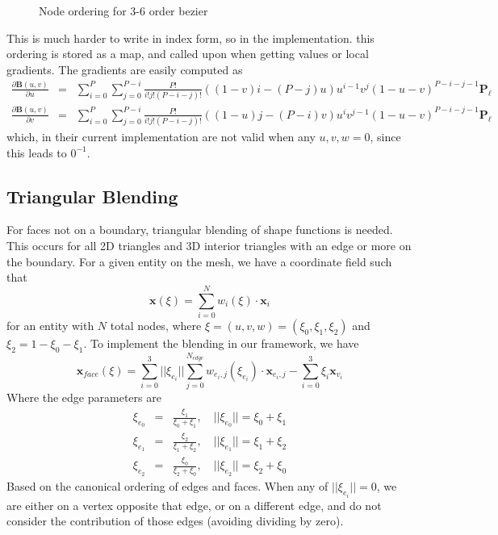 \documentclass{article}
\begin{document}
\begin{figure}
\begin{tikzpicture}[scale=1]
\end{tikzpicture}
\caption{Node ordering for 3-6 order bezier}
\end{figure}


This is much harder to write in index form, so in the implementation. this ordering is stored as a map, and called upon when getting values or local gradients. The gradients are easily computed as 
\begin{eqnarray*}
\frac{\partial \mathbf{B}(u,v)}{\partial u} &=& \displaystyle\sum_{i=0}^P \sum_{j=0}^{P-i}\frac{P!}{i!j!(P-i-j)!}((1-v)i-(P-j)u)u^{i-1}v^j(1-u-v)^{P-i-j-1}\mathbf{P}_\ell \\
\frac{\partial \mathbf{B}(u,v)}{\partial v} &=& \displaystyle\sum_{i=0}^P \sum_{j=0}^{P-i}\frac{P!}{i!j!(P-i-j)!}((1-u)j-(P-i)v)u^{i}v^{j-1}(1-u-v)^{P-i-j-1}\mathbf{P}_\ell
\end{eqnarray*}
which, in their current implementation are not valid when any $u,v,w = 0$, since this leads to $0^{-1}$.
\subsection{Triangular Blending}
For faces not on a boundary, triangular blending of shape functions is needed. This occurs for all 2D triangles and 3D interior triangles with an edge or more on the boundary. For a given entity on the mesh, we have a coordinate field such that 
\[ \mathbf{x}(\xi) = \sum_{i=0}^N w_i(\xi) \cdot \mathbf{x}_i \]
for an entity with $N$ total nodes, where $\xi = (u,v,w) = (\xi_0,\xi_1,\xi_2)$ and $\xi_2 = 1-\xi_0-\xi_1$. To implement the blending in our framework, we have 
\[\mathbf{x}_{face}(\xi) = \sum_{i=0}^{3}||\xi_{e_i}||\sum_{j=0}^{N_{edge}}w_{e_i,j}(\xi_{e_i})\cdot\mathbf{x}_{e_i,j}- \sum_{i=0}^{3}\xi_i\mathbf{x}_{v_i}\]
Where the edge parameters are
\begin{eqnarray*} 
\xi_{e_0} & = & \frac{\xi_1}{\xi_0+\xi_1},\quad ||\xi_{e_0}|| = \xi_0+\xi_1 \\
\xi_{e_1} & = & \frac{\xi_2}{\xi_1+\xi_2},\quad ||\xi_{e_1}|| = \xi_1+\xi_2 \\
\xi_{e_2} & = & \frac{\xi_0}{\xi_2+\xi_0},\quad ||\xi_{e_2}|| = \xi_2+\xi_0 
\end{eqnarray*}
Based on the canonical ordering of edges and faces. When any of $||\xi_{e_i}|| = 0$, we are either on a vertex opposite that edge, or on a different edge, and do not consider the contribution of those edges (avoiding dividing by zero).
\end{document}

